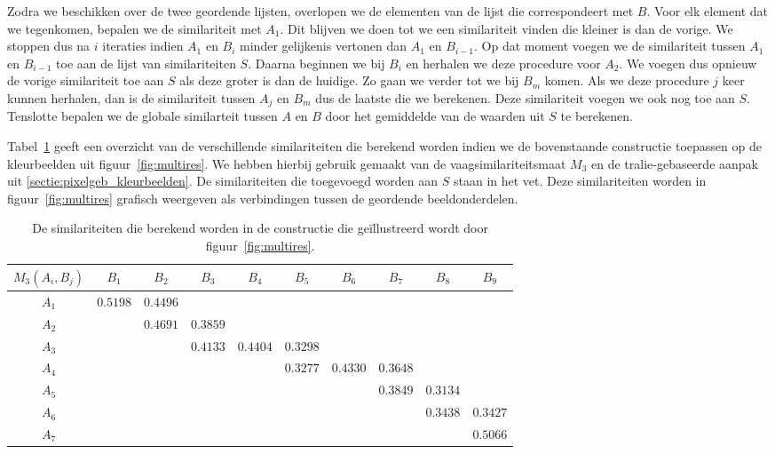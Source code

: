 Zodra we beschikken over de twee geordende lijsten, overlopen we de elementen van de 
lijst die correspondeert met $B$. Voor
elk element dat we tegenkomen, bepalen we de similariteit met $A_1$. Dit blijven we doen
tot we een similariteit vinden die kleiner is dan de vorige. We stoppen dus na $i$ iteraties 
indien $A_1$ en $B_i$ minder gelijkenis vertonen dan $A_1$ en $B_{i-1}$. Op dat moment voegen
we de similariteit tussen $A_1$ en $B_{i-1}$ toe aan de lijst van similariteiten $S$. Daarna
beginnen we bij $B_i$ en herhalen we deze procedure voor $A_2$. We voegen dus opnieuw de vorige
similariteit toe aan $S$ als deze groter is dan de huidige. Zo gaan we verder tot we bij
$B_m$ komen. Als we deze procedure $j$ keer kunnen herhalen, dan
is de similariteit tussen $A_j$ en $B_m$ dus de laatste die we berekenen. Deze similariteit
voegen we ook nog toe aan $S$. Tenslotte bepalen we de globale similarteit tussen $A$ en $B$ 
door het gemiddelde van de waarden uit $S$ te berekenen.

Tabel~\ref{tab:multires} geeft een overzicht van de 
verschillende similariteiten die berekend worden indien we de bovenstaande constructie
toepassen op de kleurbeelden uit figuur~\ref{fig:multires}. We hebben hierbij gebruik gemaakt 
van de vaagsimilariteitsmaat $M_3$ en de tralie-gebaseerde aanpak uit \ref{sectie:pixelgeb_kleurbeelden}.
De similariteiten die  
toegevoegd worden aan $S$ staan in het vet. Deze similariteiten 
worden in figuur~\ref{fig:multires} grafisch weergeven als verbindingen tussen de
geordende beeldonderdelen.
\begin{table}
\begin{center}
\begin{tabular}{|c|ccccccccc|}
\hline
$\scriptstyle M_3(A_i,B_j)$	& $B_1$ & $B_2$ & $B_3$ & $B_4$ & $B_5$ & $B_6$ & $B_7$ & $B_8$ & $B_9$  \\
\hline
$A_1$ 	& $\mathbf{\scriptstyle 0.5198}$ & $\scriptstyle 0.4496$ & & & & & & & \\
$A_2$ 	& & $\mathbf{\scriptstyle 0.4691}$ & $\scriptstyle 0.3859$ & & & & & & \\
$A_3$ 	& & & $\scriptstyle 0.4133$ & $\mathbf{\scriptstyle 0.4404}$ & $\scriptstyle 0.3298$ & & & & \\
$A_4$ 	& & & & & $\scriptstyle 0.3277$ & $\mathbf{\scriptstyle 0.4330}$ & $\scriptstyle 0.3648$ & & \\
$A_5$ 	& & & & & & & $\mathbf{\scriptstyle 0.3849}$ & $\scriptstyle 0.3134$ & \\
$A_6$ 	& & & & & & & & $\mathbf{\scriptstyle 0.3438}$ & $\scriptstyle 0.3427$ \\
$A_7$ 	& & & & & & & & & $\mathbf{\scriptstyle 0.5066}$ \\
\hline
\end{tabular}
\caption{\label{tab:multires}De similariteiten die berekend worden in de constructie die ge\"illustreerd wordt door figuur~\ref{fig:multires}.}
\end{center}
\end{table}

